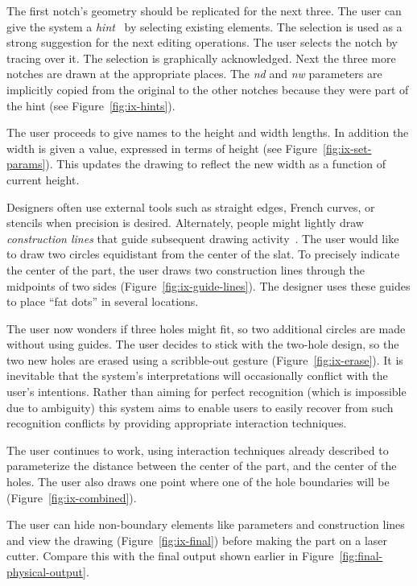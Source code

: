 \documentclass[12pt]{article}
\begin{document}
The first notch's geometry should be replicated for the next
three. The user can give the system a
\textit{hint}~\cite{mcdaniel-gamut} by selecting existing
elements. The selection is used as a strong suggestion for the next
editing operations. The user selects the notch by tracing over it. The
selection is graphically acknowledged. Next the three more notches are
drawn at the appropriate places. The \textit{nd} and \textit{nw}
parameters are implicitly copied from the original to the other
notches because they were part of the hint (see
Figure~\ref{fig:ix-hints}).

The user proceeds to give names to the height and width lengths. In
addition the width is given a value, expressed in terms of height (see
Figure~\ref{fig:ix-set-params}). This updates the drawing to reflect
the new width as a function of current height.

Designers often use external tools such as straight edges, French
curves, or stencils when precision is desired. Alternately, people
might lightly draw \textit{construction lines} that guide subsequent
drawing activity~\cite{company-sketching-in-engineering}. The user
would like to draw two circles equidistant from the center of the
slat. To precisely indicate the center of the part, the user draws two
construction lines through the midpoints of two sides
(Figure~\ref{fig:ix-guide-lines}). The designer uses these guides
to place ``fat dots'' in several locations.

The user now wonders if three holes might fit, so two additional
circles are made without using guides. The user decides to stick with
the two-hole design, so the two new holes are erased using a
scribble-out gesture (Figure~\ref{fig:ix-erase}). It is inevitable
that the system's interpretations will occasionally conflict with the
user's intentions. Rather than aiming for perfect recognition (which
is impossible due to ambiguity) this system aims to enable users to
easily recover from such recognition conflicts by providing
appropriate interaction techniques.

The user continues to work, using interaction techniques already
described to parameterize the distance between the center of the part,
and the center of the holes. The user also draws one point where one
of the hole boundaries will be (Figure~\ref{fig:ix-combined}).

The user can hide non-boundary elements like parameters and
construction lines and view the drawing (Figure~\ref{fig:ix-final})
before making the part on a laser cutter. Compare this with the final
output shown earlier in Figure~\ref{fig:final-physical-output}.
\end{document}
